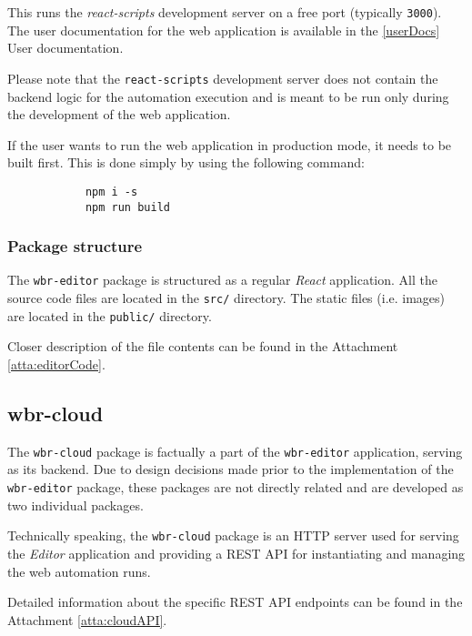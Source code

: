 This runs the \textit{react-scripts} development server on a free port (typically \texttt{3000}).
The user documentation for the web application is available in the \autoref{userDocs} User documentation.

Please note that the \texttt{react-scripts} development server does not contain the backend logic for the automation execution
and is meant to be run only during the development of the web application.

If the user wants to run the web application in production mode, it needs to be built first. This is done simply by using the following command:
\begin{center}
    \begin{minipage}[h!]{0.5\textwidth}
        \begin{verbatim}
            npm i -s
            npm run build
        \end{verbatim}        
    \end{minipage}
\end{center}

\subsubsection{Package structure}

The \texttt{wbr-editor} package is structured as a regular \textit{React} application. 
All the source code files are located in the \texttt{src/} directory.
The static files (i.e. images) are located in the \texttt{public/} directory.

Closer description of the file contents can be found in the Attachment \ref{atta:editorCode}.

\subsection{wbr-cloud}

The \texttt{wbr-cloud} package is factually a part of the \texttt{wbr-editor} application, serving as its backend.
Due to design decisions made prior to the implementation of the \texttt{wbr-editor} package, these packages are not directly related and are developed as two individual packages.

Technically speaking, the \texttt{wbr-cloud} package is an HTTP server used for serving the \textit{Editor} application and providing a REST \ac{API} for instantiating and managing the web automation runs.

Detailed information about the specific REST API endpoints can be found in the Attachment \ref{atta:cloudAPI}.
